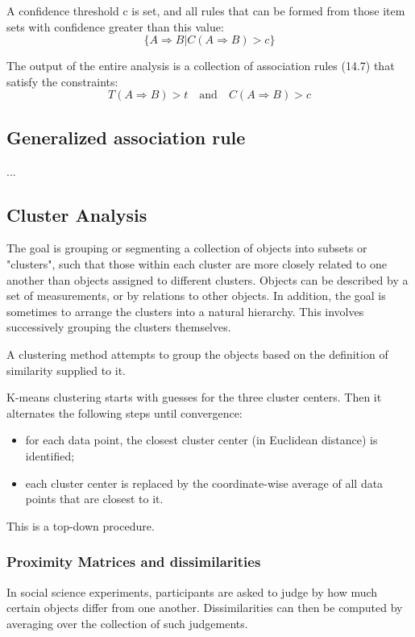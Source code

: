 \documentclass[12pt, letterpaper]{article}
\theoremstyle{definition}
\begin{document}
A confidence threshold c is set, and all rules that can be formed from those item sets with confidence greater than this value:
\begin{equation}
\{ A\Rightarrow B| C(A\Rightarrow B)>c\}
\end{equation}


The output of the entire analysis is a collection of association rules (14.7) that satisfy the constraints:
\begin{equation}
T(A \Rightarrow B) >t \quad \text{and}\quad C(A \Rightarrow B)>c
\end{equation}

\subsection{Generalized association rule}
...

\subsection{Cluster Analysis}
The goal is grouping or segmenting a collection of objects into subsets or "clusters", such that those within each cluster are more closely related to one another than objects assigned to different clusters. Objects can be described by a set of measurements, or by relations to other objects. In addition, the goal is sometimes to arrange the clusters into a natural hierarchy. This involves successively grouping the clusters themselves.

A clustering method attempts to group the objects based on the definition of similarity supplied to it.

K-means clustering starts with guesses for the three cluster centers. Then it alternates the following steps until convergence:
\begin{itemize}
\item  for each data point, the closest cluster center (in Euclidean distance) is identified;
\item each cluster center is replaced by the coordinate-wise average of all data points that are closest to it.
\end{itemize}

This is a top-down procedure.

\subsubsection{Proximity Matrices and dissimilarities}
In social science experiments, participants are asked to judge by how much certain objects differ from one another. Dissimilarities can then be computed by averaging over the collection of such judgements.
\end{document}
